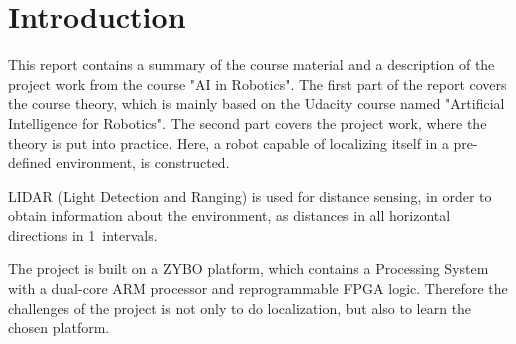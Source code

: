 \documentclass[Main]{subfiles}
\begin{document}
\chapter{Introduction} %
\label{cha:introduction}

	This report contains a summary of the course material and a description of the project work from the course "AI in Robotics".
	The first part of the report covers the course theory, which is mainly based on the Udacity course named "Artificial Intelligence for Robotics".
	The second part covers the project work, where the theory is put into practice.
	Here, a robot capable of localizing itself in a pre-defined environment, is constructed.

	LIDAR (Light Detection and Ranging) is used for distance sensing, in order to obtain information about the environment, as distances in all horizontal directions in 1\degree\ intervals.

	The project is built on a ZYBO platform, which contains a Processing System with a dual-core ARM processor and reprogrammable FPGA logic.
	Therefore the challenges of the project is not only to do localization, but also to learn the chosen platform.

\end{document}
